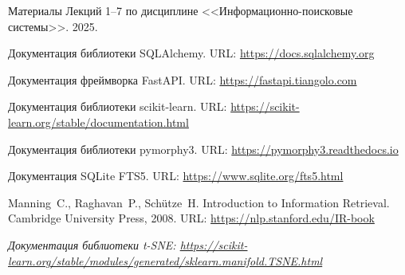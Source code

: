 \documentclass[a4paper,12pt]{article}
\begin{document}
\begin{enumerate}[label={[\arabic*]}, leftmargin=1.5cm]
  \item Материалы Лекций 1--7 по дисциплине <<Информационно-поисковые системы>>. 2025.
  \item Документация библиотеки SQLAlchemy. URL: \url{https://docs.sqlalchemy.org}
  \item Документация фреймворка FastAPI. URL: \url{https://fastapi.tiangolo.com}
  \item Документация библиотеки scikit-learn. URL: \url{https://scikit-learn.org/stable/documentation.html}
  \item Документация библиотеки pymorphy3. URL: \url{https://pymorphy3.readthedocs.io}
  \item Документация SQLite FTS5. URL: \url{https://www.sqlite.org/fts5.html}
  \item Manning~C., Raghavan~P., Sch\"utze~H. Introduction to Information Retrieval. Cambridge University Press, 2008. URL: \url{https://nlp.stanford.edu/IR-book}
\end{enumerate}

\begin{infobox}
\textit{Документация библиотеки t-SNE: \url{https://scikit-learn.org/stable/modules/generated/sklearn.manifold.TSNE.html}}
\end{infobox}
\end{document}
